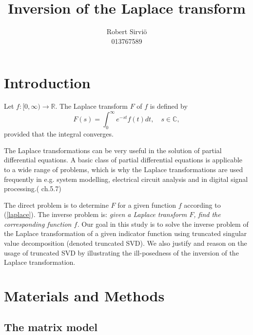 \documentclass[12pt,a4]{article}
\title{Inversion of the Laplace transform}
\author{Robert Sirviö\\013767589}
\newcommand{\R}{{\mathbb R}}
\newcommand{\C}{{\mathbb C}}
\begin{document}
\maketitle

\section{Introduction}

Let $f:[0,\infty)\rightarrow \R$. The Laplace transform $F$ of $f$ is defined by
\begin{equation}\label{laplace}
 F(s) = \int_0^\infty e^{-st}f(t)dt,\quad s\in\C ,
\end{equation}
provided that the integral converges.     
\newline


The Laplace transformations can be very useful in the solution of partial differential equations. A basic class of partial differential equations is applicable to a wide range of problems, which is why the Laplace transformations are used frequently in e.g. system modelling, electrical circuit analysis and in digital signal processing.(\cite{transforms} ch.5.7)
\newline 

The direct problem is to determine $F$ for a given function $f$ according to (\ref{laplace}). The inverse problem is: {\em given a Laplace transform $F$, find the corresponding function $f$.} Our goal in this study is to solve the inverse problem of the Laplace transformation of a given indicator function using truncated singular value decomposition (denoted truncated SVD). We also justify and reason on the usage of truncated SVD by illustrating the ill-posedness of the inversion of the Laplace transformation.



\section{Materials and Methods}\label{sec:methods}

\subsection{The matrix model}
\end{document}
